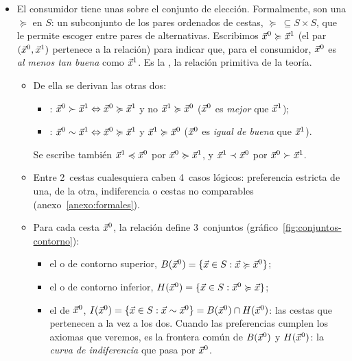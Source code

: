 \documentclass[11pt]{article}
\begin{document}
\begin{itemize}
\item El consumidor tiene unas  sobre el conjunto de elección. Formalmente, son una  $\succcurlyeq$ en $S$: un subconjunto de los pares ordenados de cestas, $\succcurlyeq\ \subseteq S\times S$, que le permite escoger entre pares de alternativas. Escribimos $\vec{x}^0\succcurlyeq \vec{x}^1$ (el par $(\vec{x}^0,\vec{x}^1)$ pertenece a la relación) para indicar que, para el consumidor, $\vec{x}^0$ es \emph{al menos tan buena} como $\vec{x}^1$. Es la , la relación primitiva de la teoría.
  \begin{itemize}
  \item De ella se derivan las otras dos:
    \begin{itemize}
    \item {}: $\vec{x}^0\succ \vec{x}^1 \Leftrightarrow \vec{x}^0\succcurlyeq \vec{x}^1$ y no $\vec{x}^1\succcurlyeq \vec{x}^0$ ($\vec{x}^0$ es \emph{mejor} que $\vec{x}^1$);
    \item {}: $\vec{x}^0\sim \vec{x}^1 \Leftrightarrow \vec{x}^0\succcurlyeq \vec{x}^1$ y $\vec{x}^1\succcurlyeq \vec{x}^0$ ($\vec{x}^0$ es \emph{igual de buena} que $\vec{x}^1$).
    \end{itemize}
    Se escribe también $\vec{x}^1\preccurlyeq \vec{x}^0$ por $\vec{x}^0\succcurlyeq \vec{x}^1$, y $\vec{x}^1\prec \vec{x}^0$ por $\vec{x}^0\succ \vec{x}^1$.
  \item Entre 2~cestas cualesquiera caben 4~casos lógicos: preferencia estricta de una, de la otra, indiferencia o cestas no comparables (anexo~\ref{anexo:formales}).
  \item Para cada cesta $\vec{x}^0$, la relación define 3~conjuntos (gráfico~\ref{fig:conjuntos-contorno}):
    \begin{itemize}
    \item el  o de contorno superior, $B(\vec{x}^0)=\{\vec{x}\in S: \vec{x}\succcurlyeq \vec{x}^0\}$;
    \item el  o de contorno inferior, $H(\vec{x}^0)=\{\vec{x}\in S: \vec{x}^0\succcurlyeq \vec{x}\}$;
    \item el  de $\vec{x}^0$, $I(\vec{x}^0)=\{\vec{x}\in S: \vec{x}\sim \vec{x}^0\}=B(\vec{x}^0)\cap H(\vec{x}^0)$: las cestas que pertenecen a la vez a los dos. Cuando las preferencias cumplen los axiomas que veremos, es la frontera común de $B(\vec{x}^0)$ y $H(\vec{x}^0)$: la \emph{curva de indiferencia} que pasa por $\vec{x}^0$.
    \end{itemize}
  \end{itemize}
\end{itemize}
\end{document}
